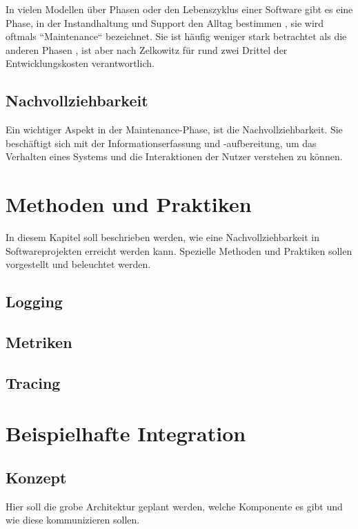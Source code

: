 \documentclass[oneside, ngerman, final, 11pt, a4paper, 1.1headlines, headinclude=false, footinclude=false, mpinclude=false, pagesize, onecolumn, titlepage, parskip=half, headsepline, chapterprefix=false, version=first, listof=totoc, bibliography=totoc, toc=graduated, fleqn, twoside=true]{scrbook}
\begin{document}
			In vielen Modellen über Phasen oder den Lebenszyklus einer Software gibt es eine Phase, in der Instandhaltung und Support den Alltag bestimmen \citationneeded, sie wird oftmals ``Maintenance`` bezeichnet. Sie ist häufig weniger stark betrachtet als die anderen Phasen \citationneeded, ist aber nach Zelkowitz \etal \cite{PrinciplesOfSoftwareEngineeringAndDesign} für rund zwei Drittel der Entwicklungskosten verantwortlich.
	
		\section{Nachvollziehbarkeit}
		
			Ein wichtiger Aspekt in der Maintenance-Phase, ist die Nachvollziehbarkeit. Sie beschäftigt sich mit der Informationserfassung und -aufbereitung, um das Verhalten eines Systems und die Interaktionen der Nutzer verstehen zu können.
		
	\chapter{Methoden und Praktiken}

		In diesem Kapitel soll beschrieben werden, wie eine Nachvollziehbarkeit in Softwareprojekten erreicht werden kann. Spezielle Methoden und Praktiken sollen vorgestellt und beleuchtet werden.
		
		\section{Logging}
		
		\section{Metriken}
		
		\section{Tracing}
	
	\chapter{Beispielhafte Integration}
	
		\section{Konzept}
		
		Hier soll die grobe Architektur geplant werden, welche Komponente es gibt und wie diese kommunizieren sollen.
	
\end{document}
